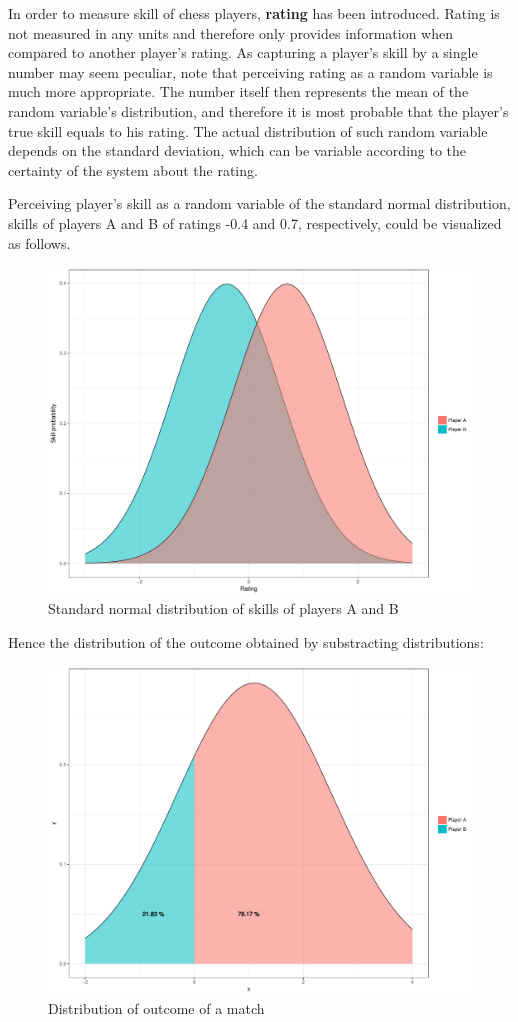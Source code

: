 In order to measure skill of chess players, \textbf{rating} has been introduced. Rating is not measured in any units and therefore only provides information when compared to another player's rating. As capturing a player's skill by a single number may seem peculiar, note that perceiving rating as a random variable is much more appropriate. The number itself then represents the mean of the random variable's distribution, and therefore it is most probable that the player's true skill equals to his rating. The actual distribution of such random variable depends on the standard deviation, which can be variable according to the certainty of the system about the rating.

\examplespace
\begin{example}
Perceiving player's skill as a random variable of the standard normal distribution, skills of players A and B of ratings -0.4 and 0.7, respectively, could be visualized as follows.

\begin{figure}[H]
\centering
\includegraphics[width=.8\linewidth]{figs/players_skill_distribution}
\caption{Standard normal distribution of skills of players A and B}
\end{figure}

\noindent Hence the distribution of the outcome obtained by substracting distributions:
\begin{figure}[H]
\centering
\includegraphics[width=.8\linewidth]{figs/outcome_distribution}
\caption{Distribution of outcome of a match}
\end{figure}


\end{example}
